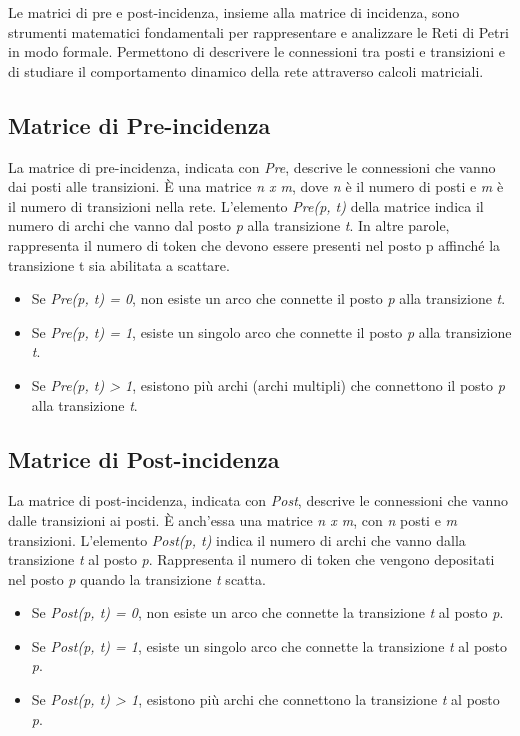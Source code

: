 Le matrici di pre e post-incidenza, insieme alla matrice di incidenza, sono strumenti matematici fondamentali per rappresentare e analizzare le Reti di Petri in modo formale. Permettono di descrivere le connessioni tra posti e transizioni e di studiare il comportamento dinamico della rete attraverso calcoli matriciali.

\subsection{Matrice di Pre-incidenza}
La matrice di pre-incidenza, indicata con \textit{Pre}, descrive le connessioni che vanno dai posti alle transizioni. È una matrice \textit{n x m}, dove \textit{n} è il numero di posti e \textit{m} è il numero di transizioni nella rete. L'elemento \textit{Pre(p, t)} della matrice indica il numero di archi che vanno dal posto \textit{p} alla transizione \textit{t}. In altre parole, rappresenta il numero di token che devono essere presenti nel posto p affinché la transizione t sia abilitata a scattare.

\begin{itemize}
    \item Se \textit{Pre(p, t) = 0}, non esiste un arco che connette il posto \textit{p} alla transizione \textit{t}.
    \item Se \textit{Pre(p, t) = 1}, esiste un singolo arco che connette il posto \textit{p} alla transizione \textit{t}.
    \item Se \textit{Pre(p, t) > 1}, esistono più archi (archi multipli) che connettono il posto \textit{p} alla transizione \textit{t}.
\end{itemize}

\subsection{Matrice di Post-incidenza}
La matrice di post-incidenza, indicata con \textit{Post}, descrive le connessioni che vanno dalle transizioni ai posti. È anch'essa una matrice \textit{n x m}, con \textit{n} posti e \textit{m} transizioni. L'elemento \textit{Post(p, t)} indica il numero di archi che vanno dalla transizione \textit{t} al posto \textit{p}. Rappresenta il numero di token che vengono depositati nel posto \textit{p} quando la transizione \textit{t} scatta.

\begin{itemize}
    \item Se \textit{Post(p, t) = 0}, non esiste un arco che connette la transizione \textit{t} al posto \textit{p}.
    \item Se \textit{Post(p, t) = 1}, esiste un singolo arco che connette la transizione \textit{t} al posto \textit{p}.
    \item Se \textit{Post(p, t) > 1}, esistono più archi che connettono la transizione \textit{t} al posto \textit{p}.
\end{itemize}

